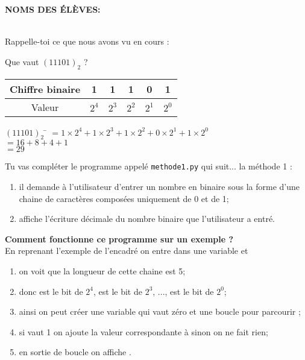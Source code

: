 \documentclass[a4paper,12pt,french]{book}
\begin{document}
\textbf{NOMS DES \'ELÈVES:}\\


\exo{}\\
Rappelle-toi ce que nous avons vu en cours :
\begin{methode}
Que vaut $(11101)_2$ ?
\begin{center}
	\begin{tabular}{|c|c|c|c|c|c|}
		\hline 
		Chiffre binaire & 1 & 1 & 1 & 0 & 1 \\ 
		\hline 
		Valeur & $2^4$ & $2^3$ & $2^2$ & $2^1$ & $2^0$ \\ 
		\hline 
	\end{tabular}
\end{center}
\begin{tabbing}
		$(11101)_2$	\= 	$=1\times 2^4+1\times 2^3+1\times 2^2+0\times 2^1+1\times 2^0$	\\
			\>	$=16+8+4+1$	\\	
			\>	$=29$	
	\end{tabbing}
\end{methode}

    Tu vas compléter le programme appelé \texttt{methode1.py} qui suit... la méthode 1 :
\begin{enumerate}[--]
	\item 	il demande à l'utilisateur d'entrer un nombre en binaire sous la forme d'une chaine de caractères composées uniquement de 0 et de 1;
	\item 	affiche l'écriture décimale du nombre binaire que l'utilisateur a entré.\\
\end{enumerate}

\textbf{Comment fonctionne ce programme sur un exemple ?}\\

En reprenant l'exemple de l'encadré on entre  dans une variable  et
\begin{enumerate}[--]
	\item 	on voit que la longueur de cette chaine est 5;
	\item 	donc  est le bit de $2^4$,  est le bit de $2^3$, ...,  est le bit de $2^0$;
	\item 	ainsi on peut créer une variable  qui vaut zéro et une boucle  pour parcourir ;
	\item 	si  vaut 1 on ajoute la valeur correspondante à  sinon on ne fait rien;
	\item 	en sortie de boucle on affiche .
\end{enumerate}
\end{document}
